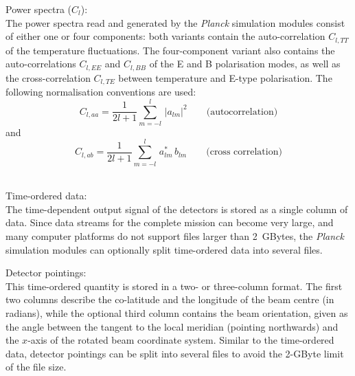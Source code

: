 \documentclass{aa}
\begin{document}
\begin{description}
  \item {Power spectra ($C_l$):}\\ The power spectra read and
    generated by the \emph{Planck} simulation modules consist of
    either one or four components: both variants contain the
    auto-correlation $C_{l,TT}$ of the temperature fluctuations. The
    four-component variant also contains the auto-correlations
    $C_{l,EE}$ and $C_{l,BB}$ of the E and B polarisation modes, as
    well as the cross-correlation $C_{l,TE}$ between temperature and
    E-type polarisation. The following normalisation conventions are
    used:
    \begin{equation}
      C_{l,aa}=\frac{1}{2l+1}\sum_{m=-l}^l\,|a_{lm}|^2
      \qquad\text{(autocorrelation)}
    \end{equation}
    and
    \begin{equation}
      C_{l,ab}=\frac{1}{2l+1}\sum_{m=-l}^l\,a_{lm}^*\,b_{lm}
      \qquad\text{(cross correlation)}
    \end{equation}\\

  \item {Time-ordered data:}\\ The time-dependent output signal of the
    detectors is stored as a single column of data. Since data streams
    for the complete mission can become very large, and many computer
    platforms do not support files larger than 2~GBytes, the
    \emph{Planck} simulation modules can optionally split time-ordered
    data into several files.\\

  \item {Detector pointings:}\\ This time-ordered quantity is stored
    in a two- or three-column format. The first two columns describe
    the co-latitude and the longitude of the beam centre (in radians),
    while the optional third column contains the beam orientation,
    given as the angle between the tangent to the local meridian
    (pointing northwards) and the $x$-axis of the rotated beam
    coordinate system. Similar to the time-ordered data, detector
    pointings can be split into several files to avoid the 2-GByte
    limit of the file size.\\


\end{description}
\end{document}
